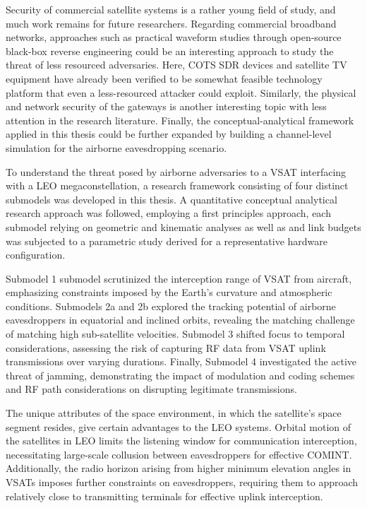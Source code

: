 \documentclass[english, 12pt, a4paper, elec, utf8, a-1b, online]{aaltothesis}
\begin{document}
Security of commercial satellite systems is a rather young field of study, and much work remains for future researchers.
Regarding commercial broadband networks, approaches such as practical waveform studies through open-source black-box reverse engineering could be an interesting approach to study the threat of less resourced adversaries.
Here, COTS SDR devices and satellite TV equipment have already been verified to be somewhat feasible technology platform that even a less-resourced attacker could exploit.
Similarly, the physical and network security of the gateways is another interesting topic with less attention in the research literature.
Finally, the conceptual-analytical framework applied in this thesis could be further expanded by building a channel-level simulation for the airborne eavesdropping scenario.

To understand the threat posed by airborne adversaries to a VSAT interfacing with a LEO megaconstellation, a research framework consisting of four distinct submodels was developed in this thesis. A quantitative conceptual analytical research approach was followed, employing a first principles approach, each submodel relying on geometric and kinematic analyses as well as and link budgets was subjected to a parametric study derived for a representative hardware configuration.

Submodel 1 submodel scrutinized the interception range of VSAT from aircraft, emphasizing constraints imposed by the Earth's curvature and atmospheric conditions. Submodels 2a and 2b explored the tracking potential of airborne eavesdroppers in equatorial and inclined orbits, revealing the matching challenge of matching high sub-satellite velocities. Submodel 3 shifted focus to temporal considerations, assessing the risk of capturing RF data from VSAT uplink transmissions over varying durations. Finally, Submodel 4 investigated the active threat of jamming, demonstrating the impact of modulation and coding schemes and RF path considerations on disrupting legitimate transmissions.

The unique attributes of the space environment, in which the satellite's space segment resides, give certain advantages to the LEO systems.
Orbital motion of the satellites in LEO limits the listening window for communication interception, necessitating large-scale collusion between eavesdroppers for effective COMINT.
Additionally, the radio horizon arising from higher minimum elevation angles in VSATs imposes further constraints on eavesdroppers, requiring them to approach relatively close to transmitting terminals for effective uplink interception.
\end{document}
